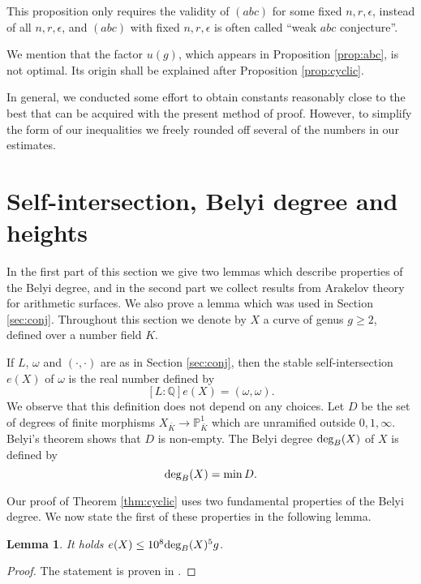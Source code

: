 \documentclass[11pt]{article}
\newtheorem{lemma}[theorem]{Lemma}
\numberwithin{equation}{section}
\def\deg{\textnormal{deg}}
\newcommand {\QQ}  {{\mathbb Q}}
\begin{document}
This proposition only requires the validity of $(abc)$ for some fixed $n,r,\epsilon$, instead of all  $n,r,\epsilon$, and $(abc)$ with fixed $n,r,\epsilon$ is often called ``weak $abc$ conjecture''. 

We mention that the factor $u(g)$, which appears in Proposition \ref{prop:abc}, is not optimal. Its origin shall be explained after Proposition \ref{prop:cyclic}. 

In general, we conducted some effort to obtain constants reasonably close to the best that can be acquired with the present method of proof. However, to simplify the form of our inequalities we freely rounded off several of the numbers in our estimates.


\section{Self-intersection, Belyi degree and heights}\label{sec:curves}

In the first part of this section we give two lemmas which describe properties of the Belyi degree, and in the second part we collect results from Arakelov theory for arithmetic surfaces. We also prove a lemma which was used in Section \ref{sec:conj}.
Throughout this section we denote by $X$  a curve of genus $g\geq 2$, defined over a number field $K$.

If $L$, $\omega$ and $(\cdot ,\cdot)$ are as in Section \ref{sec:conj}, then  the stable self-intersection $e(X)$ of $\omega$ is the real number defined by
\begin{equation}\label{def:ex}
[L:\QQ]e(X)=(\omega,\omega).
\end{equation}
We observe that this definition does not depend on any choices. Let $D$ be the set of degrees of finite morphisms $X_{\bar{K}}\to \mathbb P^1_{\bar{K}}$ which are unramified outside $0,1,\infty$. Belyi's theorem \cite{belyi:theorem} shows that $D$ is non-empty. The Belyi degree $\deg_B(X)$ of $X$ is defined by
\begin{equation}\label{def:belyi}
 \deg_B(X)=\min D.
\end{equation}


Our proof of Theorem \ref{thm:cyclic} uses two fundamental properties of the Belyi degree. We now state the first of these properties in the following lemma.  

\begin{lemma}\label{lem:ex}
It holds
$e(X)\leq 10^8\deg_B(X)^5g$.
\end{lemma}
\begin{proof}The statement is proven in \cite[Theorem 1.1.1]{javanpeykar:belyi}. \end{proof}
\end{document}
